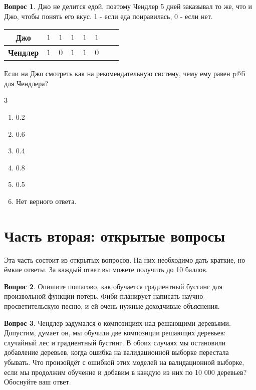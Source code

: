\documentclass[12pt]{article}
\newenvironment{answerlist}[1][3]{
\begin{multicols}{#1}

\begin{enumerate}[label=\fbox{\emph{\Alph*}},ref=\emph{\alph*}]
}
{
\item Нет верного ответа.
\end{enumerate}
\end{multicols}
}
\theoremstyle{definition}
\newtheorem{question}{Вопрос}
\begin{document}
\begin{question}
Джо не делится едой, поэтому Чендлер 5 дней заказывал то же, что и Джо, чтобы понять его вкус. 1 - если еда понравилась, 0 - если нет.
\begin{table}[h]
    \centering
    \begin{tabular}{>{\bfseries}cccccccc}
        \toprule
         Джо & $1$ & $1$ & $1$ & $1$ & $1$  \\ \midrule
         Чендлер & $1$ & $0$ & $1$ & $1$ & $0$ \\
         \bottomrule
    \end{tabular}
\end{table}
Если на Джо смотреть как на рекомендательную систему, чему ему равен p@5 для Чендлера?
\begin{answerlist}
  \item 0.2
  \item 0.6
  \item 0.4
  \item 0.8
  \item 0.5
\end{answerlist}
\end{question}
\newpage 

\section*{Часть вторая: открытые вопросы}

Эта часть состоит из открытых вопросов. На них необходимо дать краткие, но ёмкие ответы. За каждый ответ вы можете получить до 10 баллов.


\begin{question}
Опишите пошагово, как обучается градиентный бустинг для произвольной функции потерь. Фиби планирует написать научно-просветительскую песню, и ей очень нужные доходчивые объяснения. 
\end{question}

\vspace{7cm} 


\begin{question}
Чендлер задумался о композициях над решающими деревьями. Допустим, думает он, мы обучили две композиции решающих деревьев: случайный лес и градиентный бустинг. В обоих случаях мы остановили добавление деревьев, когда ошибка на валидационной выборке перестала убывать. Что произойдёт с ошибкой этих моделей на валидационной выборке, если мы продолжим обучение и добавим в каждую из них по 10 000 деревьев? Обоснуйте ваш ответ.
\end{question}
\end{document}
